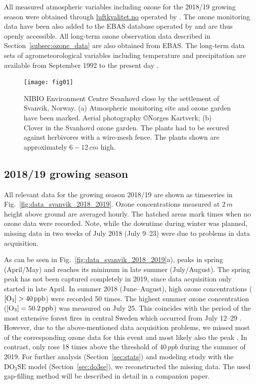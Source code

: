 \documentclass[bg, manuscript]{copernicus}
\begin{document}
All measured atmospheric variables including ozone for the 2018/19 growing season were obtained through \href{luftkvalitet.no}{luftkvalitet.no} operated by \citet{NILU_AIRQ}. The ozone monitoring data have been also added to the EBAS database operated by \citet{NILU_EBAS} and are thus openly accessible. All long-term ozone observation data described in Section~\ref{subsec:ozone_data} are also obtained from EBAS. The long-term data sets of agrometeorological variables including temperature and precipitation are available from September 1992 to the present day \citep[LandbruksMeteorologiske Tjeneste][note the station name here is Pasvik]{LMT_NIBIO}.

\begin{figure}[t]
  \texttt{[image: fig01]}
  \caption{NIBIO Environment Centre Svanhovd close by the settlement of Svanvik, Norway. (a) Atmospheric monitoring site and ozone garden have been marked. Aerial photography \copyright Norges Kartverk; (b) Clover in the Svanhovd ozone garden. The plants had to be secured against herbivores with a wire-mesh fence. The plants shown are approximately $6-12\,\unit{cm}$ high.}
  \label{fig:svanhovd_research_station}
\end{figure}


\subsection{2018/19 growing season}
\label{subsec:growing_season_1819}

All relevant data for the growing season 2018/19 are shown as timeseries in Fig.~\ref{fig:data_svanvik_2018_2019}. Ozone concentrations measured at $2\,\unit{m}$ height above ground are averaged hourly. The hatched areas mark times when no ozone data were recorded. Note, while the downtime during winter was planned, missing data in two weeks of July 2018 (July 9--23) were due to problems in data acquisition.

As can be seen in Fig.~\ref{fig:data_svanvik_2018_2019}a), \chem{[O_3]} peaks in spring (April/May) and reaches its minimum in late summer (July/August). The spring peak has not been captured completely in 2019, since data acquisition only started in late April. In summer 2018 (June--August), high ozone concentrations ($\chem{[O_3]} > 40\,\unit{ppb}$) were recorded 50 times. The highest summer ozone concentration ($\chem{[O_3]} = 50.2\,\unit{ppb}$) was measured on July 25. This coincides with the period of the most extensive forest fires in central Sweden which occurred from July 12--29 \citep{SOU2019}. However, due to the above-mentioned data acquisition problems, we missed most of the corresponding ozone data for this event and most likely also the peak \chem{[O_3]}. In contrast, \chem{[O_3]} only rose 18 times above the threshold of $40\,\unit{ppb}$ during the summer of 2019. For further analysis (Section~\ref{sec:stats}) and modeling study with the $\mathrm{DO_3SE}$ model (Section~\ref{sec:do3se}), we reconstructed the missing data. The used gap-filling method will be described in detail in a companion paper.
\end{document}
